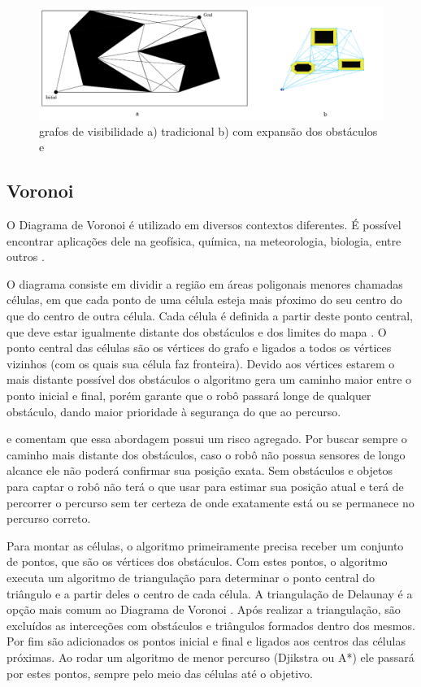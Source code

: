 \begin{figure}[h]
	\centering
	\label{fig08}
		\includegraphics[keepaspectratio=true,scale=0.6]{figuras/7visibilityGraph.png}
	\caption{grafos de visibilidade a) tradicional b) com expansão dos obstáculos \cite{Thomsen2010} e \cite{MRIT_SITE}}
\end{figure}

\subsection{Voronoi}

O Diagrama de Voronoi é utilizado em diversos contextos diferentes. É possível encontrar aplicações dele na geofísica, química, na meteorologia, biologia, entre outros \cite{VORONOI_SITE}.

O diagrama consiste em dividir a região em áreas poligonais menores chamadas células, em que cada ponto de uma célula esteja mais pŕoximo do seu centro do que do centro de outra célula. Cada célula é definida a partir deste ponto central, que deve estar igualmente distante dos obstáculos e dos limites do mapa \cite{Guzman2008}. O ponto central das células são os vértices do grafo e ligados a todos os vértices vizinhos (com os quais sua célula faz fronteira). Devido aos vértices estarem o mais distante possível dos obstáculos o algoritmo gera um caminho maior entre o ponto inicial e final, porém garante que o robô passará longe de qualquer obstáculo, dando maior prioridade à segurança do que ao percurso.

\cite{Siegwart2004} e \cite{Choset2005} comentam que essa abordagem possui um risco agregado. Por buscar sempre o caminho mais distante dos obstáculos, caso o robô não possua sensores de longo alcance ele não poderá confirmar sua posição exata. Sem obstáculos e objetos para captar o robô não terá o que usar para estimar sua posição atual e terá de percorrer o percurso sem ter certeza de onde exatamente está ou se permanece no percurso correto.

Para montar as células, o algoritmo primeiramente precisa receber um conjunto de pontos, que são os vértices dos obstáculos. Com estes pontos, o algoritmo executa um algoritmo de triangulação para determinar o ponto central do triângulo e a partir deles o centro de cada célula. A triangulação de Delaunay é a opção mais comum ao Diagrama de Voronoi \cite{Souza2008}. Após realizar a triangulação, são excluídos as interceções com obstáculos e triângulos formados dentro dos mesmos. Por fim são adicionados os pontos inicial e final e ligados aos centros das células próximas. Ao rodar um algoritmo de menor percurso (Djikstra ou A*) ele passará por estes pontos, sempre pelo meio das células até o objetivo.

